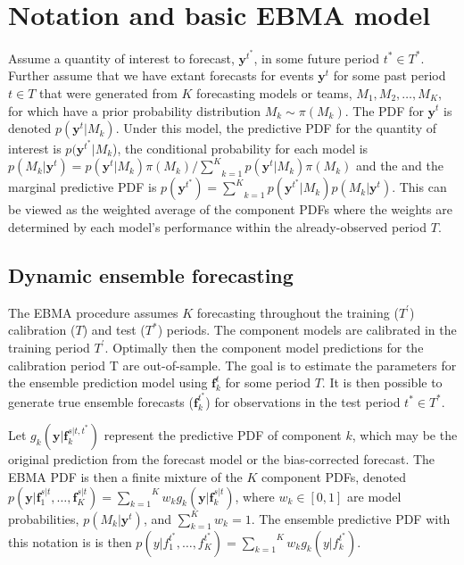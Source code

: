 \documentclass[12pt,fullpage,endnotes]{article}
\begin{document}
\section{Notation and basic EBMA model} 
\label{model}

Assume a quantity of interest to forecast, $\mathbf{y}^{t^*}$, in some
future period $t^\ast \in T^\ast$.  Further assume that we have extant
forecasts for events $\mathbf{y}^t$ for some past period $t \in T$
that were generated from $K$ forecasting models or teams, $M_1, M_2,
\ldots, M_K$, for which have a prior probability distribution $M_k\sim
\pi(M_k)$. The PDF for $\mathbf{y}^t$ is denoted
$p(\mathbf{y}^t|M_k)$.  Under this model, the predictive PDF for the
quantity of interest is $p(\mathbf{y}^{t^*}|M_k$), the conditional
probability for each model is $p(M_k|\mathbf{y}^t) =
p(\mathbf{y}^t|M_k)\pi(M_k)/\underset{k=1}{\overset{K}{\sum}}p(\mathbf{y}^t|M_k)\pi(M_k)$
and the and the marginal predictive PDF is $p(\mathbf{y}^{t^*}) =
\underset{k=1}{\overset{K}{\sum}}
p(\mathbf{y}^{t^*}|M_k)p(M_k|\mathbf{y}^{t})$.  This can be viewed as
the weighted average of the component PDFs where the weights are
determined by each model's performance within the already-observed
period $T$.

\subsection{Dynamic ensemble forecasting}

The EBMA procedure assumes $K$ forecasting throughout the training
($T^{\prime}$) calibration ($T$) and test ($T^\ast$) periods. The component models are calibrated in the training period $T^\prime$. Optimally then the component model predictions for the calibration period T are  out-of-sample. The goal is
to estimate the parameters for the ensemble prediction model using
$\mathbf{f}^{t}_k$ for some period $T$.  It is then possible to
generate true ensemble forecasts ($\mathbf{f}_k^{t^\ast}$) for
observations in the test period $t^\ast \in T^*$.

Let $g_k(\mathbf{y}|\mathbf{f}_k^{s|t, t^\ast})$ represent the
predictive PDF of component $k$, which may be the original prediction
from the forecast model or the bias-corrected forecast.  The EBMA PDF
is then a finite mixture of the $K$ component PDFs, denoted
$p(\mathbf{y}|\mathbf{f}_1^{s|t}, \ldots,
\mathbf{f}_K^{s|t})=\overset{K}{\underset{k=1}{\sum}} w_k
g_k(\mathbf{y}|\mathbf{f}_k^{s|t})$, where $w_k \in [0,1]$ are model
probabilities, $p(M_k|\mathbf{y}^t)$, and $\sum_{k=1}^Kw_k=1$. The
ensemble predictive PDF with this notation is is then
$p(y|f_{1}^{t^\ast}, \ldots,
f_{K}^{t^\ast})=\overset{K}{\underset{k=1}{\sum}} w_k
g_k(y|f_{k}^{t^*})$.
\end{document}
